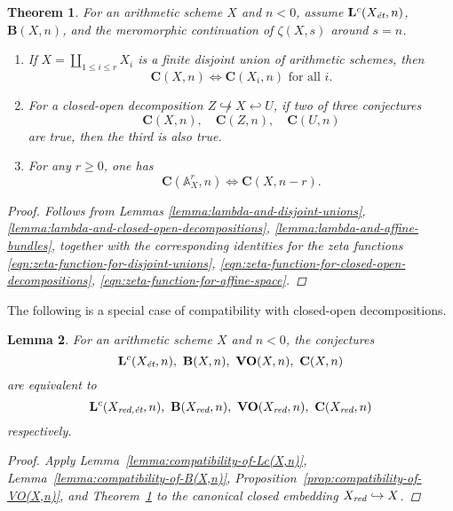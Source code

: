 \documentclass[10pt,a4paper,oneside]{article}
\renewcommand{\AA}{\mathbb{A}}
\newcommand{\et}{\text{\it \'{e}t}}
\newcommand{\red}{\text{\it red}}
\theoremstyle{myplain}
\newtheorem{theorem}{Theorem}[section]
\newtheorem{lemma}[theorem]{Lemma}
\theoremstyle{mydefinition}
\numberwithin{equation}{section}
\begin{document}
\begin{theorem}
  \label{thm:compatibility-of-C(X,n)}
  For an arithmetic scheme $X$ and $n < 0$, assume $\mathbf{L}^c (X_\et,n)$,
  $\mathbf{B} (X,n)$, and the meromorphic continuation of $\zeta (X,s)$ around
  $s = n$.

  \begin{enumerate}
  \item[1)] If $X = \coprod_{1 \le i \le r} X_i$ is a finite disjoint union of
    arithmetic schemes, then
    $$\mathbf{C} (X,n) \iff \mathbf{C} (X_i,n)\text{ for all }i.$$

  \item[2)] For a closed-open decomposition
    $Z \not\hookrightarrow X \hookleftarrow U$, if two of three conjectures
    \[ \mathbf{C} (X,n), \quad
      \mathbf{C} (Z,n), \quad
      \mathbf{C} (U,n) \]
    are true, then the third is also true.

  \item[3)] For any $r \ge 0$, one has
    $$\mathbf{C} (\AA^r_X, n) \iff \mathbf{C} (X, n-r).$$
  \end{enumerate}

  \begin{proof}
    Follows from Lemmas
    \ref{lemma:lambda-and-disjoint-unions},
    \ref{lemma:lambda-and-closed-open-decompositions},
    \ref{lemma:lambda-and-affine-bundles},
    together with the corresponding identities for the zeta functions
    \eqref{eqn:zeta-function-for-disjoint-unions},
    \eqref{eqn:zeta-function-for-closed-open-decompositions},
    \eqref{eqn:zeta-function-for-affine-space}.
  \end{proof}
\end{theorem}

The following is a special case of compatibility with closed-open
decompositions.

\begin{lemma}
  \label{lemma:compatibility-for-Xred}
  For an arithmetic scheme $X$ and $n < 0$, the conjectures
  \[
    \mathbf{L}^c (X_\et,n), ~
    \mathbf{B} (X,n), ~
    \mathbf{VO} (X,n), ~
    \mathbf{C} (X,n)
  \]
  are equivalent to
  \[
    \mathbf{L}^c (X_\text{\it red,\'{e}t},n), ~
    \mathbf{B} (X_\red,n), ~
    \mathbf{VO} (X_\red,n), ~
    \mathbf{C} (X_\red,n)
  \]
  respectively.

  \begin{proof}
    Apply Lemma~\ref{lemma:compatibility-of-Lc(X,n)},
    Lemma~\ref{lemma:compatibility-of-B(X,n)},
    Proposition~\ref{prop:compatibility-of-VO(X,n)}, and
    Theorem~\ref{thm:compatibility-of-C(X,n)} to the canonical closed embedding
    $X_\red \hookrightarrow X$.
  \end{proof}
\end{lemma}
\end{document}
